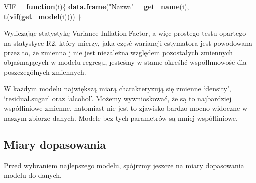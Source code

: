 \documentclass[
]{article}
\newenvironment{Shaded}{\begin{snugshade}}{\end{snugshade}}
\newcommand{\AttributeTok}[1]{\textcolor[rgb]{0.13,0.29,0.53}{#1}}
\newcommand{\ConstantTok}[1]{\textcolor[rgb]{0.56,0.35,0.01}{#1}}
\newcommand{\ControlFlowTok}[1]{\textcolor[rgb]{0.13,0.29,0.53}{\textbf{#1}}}
\newcommand{\DecValTok}[1]{\textcolor[rgb]{0.00,0.00,0.81}{#1}}
\newcommand{\FunctionTok}[1]{\textcolor[rgb]{0.13,0.29,0.53}{\textbf{#1}}}
\newcommand{\NormalTok}[1]{#1}
\newcommand{\OtherTok}[1]{\textcolor[rgb]{0.56,0.35,0.01}{#1}}
\newcommand{\SpecialCharTok}[1]{\textcolor[rgb]{0.81,0.36,0.00}{\textbf{#1}}}
\newcommand{\StringTok}[1]{\textcolor[rgb]{0.31,0.60,0.02}{#1}}
\begin{document}
\begin{Shaded}
\begin{Highlighting}[]
\NormalTok{VIF }\OtherTok{=} \ControlFlowTok{function}\NormalTok{(i)\{}
  \FunctionTok{data.frame}\NormalTok{(}\StringTok{"Nazwa"} \OtherTok{=} \FunctionTok{get\_name}\NormalTok{(i), }\FunctionTok{t}\NormalTok{(}\FunctionTok{vif}\NormalTok{(}\FunctionTok{get\_model}\NormalTok{(i))))}
\NormalTok{\}}
\end{Highlighting}
\end{Shaded}

Wyliczając statystykę Variance Inflation Factor, a więc prostego testu
opartego na statystyce R2, który mierzy, jaka część wariancji estymatora
jest powodowana przez to, że zmienna j nie jest niezależna względem
pozostałych zmiennych objaśniających w modelu regresji, jesteśmy w
stanie określić współliniowość dla poszczególnych zmiennych.

W każdym modelu największą miarą charakteryzują się zmienne `density',
`residual.sugar' oraz `alcohol'. Możemy wywnioskować, że są to
najbardziej współliniowe zmienne, natomiast nie jest to zjawisko bardzo
mocno widoczne w naszym zbiorze danych. Modele bez tych parametrów są
mniej współliniowe.

\subsection{Miary dopasowania}\label{miary-dopasowania}

Przed wybraniem najlepszego modelu, spójrzmy jeszcze na miary
dopasowania modelu do danych.

\begin{Shaded}
\end{Shaded}
\end{document}
